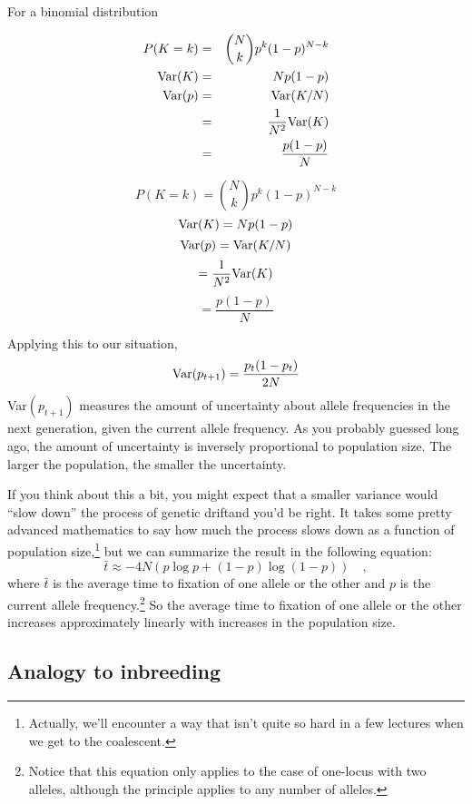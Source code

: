 \documentclass[12pt]{article}
\begin{document}
For a binomial distribution
\begin{latexonly}
\begin{eqnarray*}
P(K=k) &=& {{N \choose k}p^k(1-p)^{N-k}} \\
\hbox{Var}(K) &=& Np(1-p) \\
\hbox{Var}(p) &=& \hbox{Var}(K/N) \\
              &=& \frac{1}{N^2}\hbox{Var}(K) \\
              &=& \frac{p(1-p)}{N}
\end{eqnarray*}
\end{latexonly}
\begin{htmlonly}
\[
P(K=k) = {{N \choose k}p^k(1-p)^{N-k}}
\]
\[
\hbox{Var}(K) = Np(1-p)
\]
\[
\hbox{Var}(p) = \hbox{Var}(K/N)
\]
\[
              = \frac{1}{N^2}\hbox{Var}(K)
\]
\[
              = \frac{p(1-p)}{N}
\]
\end{htmlonly}
Applying this to our situation,
\[
\hbox{Var}(p_{t+1}) = \frac{p_t(1-p_t)}{2N}
\]
Var$(p_{t+1})$ measures the amount of uncertainty about allele
frequencies in the next generation, given the current allele
frequency. As you probably guessed long ago, the amount of uncertainty
is inversely proportional to population size. The larger the
population, the smaller the uncertainty.

If you think about this a bit, you might expect that a smaller
variance would ``slow down'' the process of genetic drift{\dash}and
you'd be right. It takes some pretty advanced mathematics to say how
much the process slows down as a function of population
size,\footnote{Actually, we'll encounter a way that isn't quite so
  hard in a few lectures when we get to the coalescent.} but we can
summarize the result in the following equation:
\[
\bar t \approx -4N\left(p\log p + (1-p)\log(1-p)\right) \quad ,
\]
where $\bar t$ is the average time to fixation of one allele or the
other and $p$ is the current allele frequency.\footnote{Notice that
  this equation only applies to the case of one-locus with two
  alleles, although the principle applies to any number of alleles.}
So the average time to fixation of one allele or the other increases
approximately linearly with increases in the population size.

\subsection*{Analogy to inbreeding}
\end{document}
